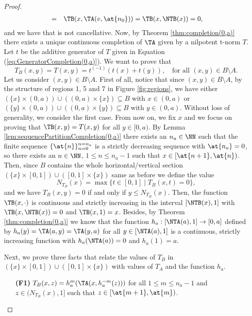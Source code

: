 \begin{proof}
\begin{eqnarray*}
		&=& \TB(x,\TA(v,\at{n_0})) = \TB(x,\NTB(x))=0,
	\end{eqnarray*}
	and we have that \TA is not cancellative. Now, by Theorem \ref{thm:completion(0,a)} there exists a unique continuous completion of $\TA$ given by a nilpotent t-norm $T$. Let $t$ be the additive generator of $T$ given in Equation (\ref{eq:GeneratorCompletion(0,a)}). We want to prove that
	$$T_B(x,y)=T(x,y)=t^{(-1)}(t(x)+t(y)), \quad \text{for all } (x,y) \in B \setminus A.$$
	Let us consider $(x,y) \in B \setminus A$. First of all, notice that since $(x,y) \in B \setminus A$, by the structure of regions 1, 5 and 7 in Figure \ref{fig:regions}, we have either $ (\{x\} \times (0,a)) \cup ((0,a) \times \{x\}) \subseteq B$ with $ x \in (0,a)$ or $ (\{y\} \times (0,a)) \cup ((0,a) \times \{y\}) \subseteq B$ with $y \in (0,a)$. Without loss of generality, we consider the first case. From now on, we fix $x$ and we focus on proving that $\TB(x,y)=T(x,y)$ for all $y \in [0,a)$. By Lemma \ref{lem:sequencePartitionCompletion(0,a)} there exists an $n_a \in \NN$ such that the finite sequence $\{\at{n}\}_{n=0}^{n=n_a}$ is a strictly decreasing sequence with $\at{n_a}=0$, so there exists an $n \in \NN$, $1 \leq n \leq n_a-1$ such that $x \in [\at{n+1},\at{n})$. Then, since $B$ contains the whole horizontal/vertical section $(\{x\} \times [0,1]) \cup ([0,1] \times \{x\})$ same as before we define the value
	$$N_{T_B}(x) = \max \{t \in [0,1] \mid T_B(x,t)=0\},$$
	and we have $T_B(x,y)=0$ if and only if $y \leq N_{T_B}(x)$. Then, the function $\TB(x,\cdot)$ is continuous and strictly increasing in the interval $[\NTB(x),1]$ with $\TB(x,\NTB(x))=0$ and $\TB(x,1)=x$. Besides, by Theorem \ref{thm:completion(0,a)} we know that the function $h_a :[\NTA(a),1] \to [0,a]$ defined by $h_a(y)=\TA(a,y)=\TA(y,a)$ for all $y \in [\NTA(a),1]$ is a continuous, strictly increasing function with $h_a(\NTA(a))=0$ and $h_a(1)=a$.
	
	Next, we prove three facts that relate the values of $T_B$ in  $(\{x\} \times [0,1]) \cup ([0,1] \times \{x\})$ with values of $T_A$ and the function $h_a$.
	\begin{itemize}
		\item[{\bf (F1)}] $T_B(x,z) = h_a^m(\TA(x,h_a^{-m}(z)))$ for all $1 \leq m \leq n_a-1$ and $z \in (N_{T_B}(x),1]$ such that $z \in [\at{m+1},\at{m})$.\\
		

\end{itemize}
\end{proof}
